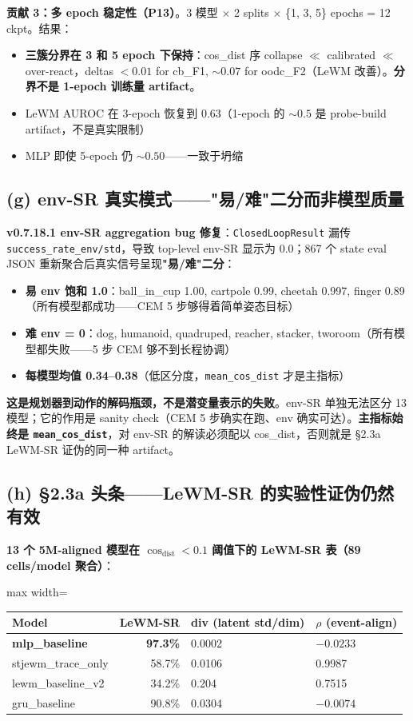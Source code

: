 \documentclass[11pt,a4paper]{article}
\begin{document}
\textbf{贡献 3：多 epoch 稳定性（P13）}。3 模型 × 2 splits × \{1, 3, 5\} epochs = 12 ckpt。结果：
\begin{itemize}[leftmargin=2em]
\item \textbf{三簇分界在 3 和 5 epoch 下保持}：cos\_dist 序 collapse $\ll$ calibrated $\ll$ over-react，deltas $<0.01$ for cb\_F1, $\sim 0.07$ for oodc\_F2（LeWM 改善）。\textbf{分界不是 1-epoch 训练量 artifact}。
\item LeWM AUROC 在 3-epoch 恢复到 0.63（1-epoch 的 $\sim 0.5$ 是 probe-build artifact，不是真实限制）
\item MLP 即使 5-epoch 仍 $\sim 0.50$——一致于坍缩
\end{itemize}

\subsection{(g) env-SR 真实模式——"易/难"二分而非模型质量}

\textbf{v0.7.18.1 env-SR aggregation bug 修复}：\texttt{ClosedLoopResult} 漏传 \texttt{success\_rate\_env/std}，导致 top-level env-SR 显示为 0.0；867 个 state eval JSON 重新聚合后真实信号呈现\textbf{"易/难"二分}：
\begin{itemize}[leftmargin=2em]
\item \textbf{易 env 饱和 1.0}：ball\_in\_cup 1.00, cartpole 0.99, cheetah 0.997, finger 0.89（所有模型都成功——CEM 5 步够得着简单姿态目标）
\item \textbf{难 env = 0}：dog, humanoid, quadruped, reacher, stacker, tworoom（所有模型都失败——5 步 CEM 够不到长程协调）
\item \textbf{每模型均值 0.34--0.38}（低区分度，\texttt{mean\_cos\_dist} 才是主指标）
\end{itemize}
\textbf{这是规划器到动作的解码瓶颈，不是潜变量表示的失败}。env-SR 单独无法区分 13 模型；它的作用是 sanity check（CEM 5 步确实在跑、env 确实可达）。\textbf{主指标始终是 \texttt{mean\_cos\_dist}}，对 env-SR 的解读必须配以 cos\_dist，否则就是 §2.3a LeWM-SR 证伪的同一种 artifact。

\subsection{(h) §2.3a 头条——LeWM-SR 的实验性证伪仍然有效}

\textbf{13 个 5M-aligned 模型在 $\cos_{\text{dist}} < 0.1$ 阈值下的 LeWM-SR 表（89 cells/model 聚合）}：
\begin{adjustbox}{max width=\textwidth}
\scriptsize
\begin{tabular}{lrll}
\toprule
\textbf{Model} & \textbf{LeWM-SR} & \textbf{div (latent std/dim)} & \textbf{$\rho$ (event-align)} \\
\midrule
\textbf{mlp\_baseline} & \textbf{97.3\%} & 0.0002 & $-0.0233$ \\
stjewm\_trace\_only & 58.7\% & 0.0106 & 0.9987 \\
lewm\_baseline\_v2 & 34.2\% & 0.204 & 0.7515 \\
gru\_baseline & 90.8\% & 0.0304 & $-0.0074$ \\
\bottomrule
\end{tabular}
\end{adjustbox}
\end{document}
